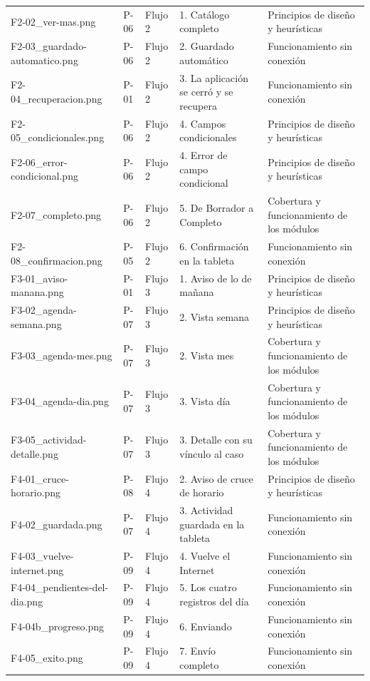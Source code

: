 \begin{longtable}{@{}p{4.2cm}p{1.1cm}p{2.2cm}p{3.2cm}p{3.4cm}@{}}
F2-02\_ver-mas.png & P-06 & Flujo 2 & 1. Catálogo completo & Principios de diseño y heurísticas \\
F2-03\_guardado-automatico.png & P-06 & Flujo 2 & 2. Guardado automático & Funcionamiento sin conexión \\
F2-04\_recuperacion.png & P-01 & Flujo 2 & 3. La aplicación se cerró y se recupera & Funcionamiento sin conexión \\
F2-05\_condicionales.png & P-06 & Flujo 2 & 4. Campos condicionales & Principios de diseño y heurísticas \\
F2-06\_error-condicional.png & P-06 & Flujo 2 & 4. Error de campo condicional & Principios de diseño y heurísticas \\
F2-07\_completo.png & P-06 & Flujo 2 & 5. De Borrador a Completo & Cobertura y funcionamiento de los módulos \\
F2-08\_confirmacion.png & P-05 & Flujo 2 & 6. Confirmación en la tableta & Funcionamiento sin conexión \\
F3-01\_aviso-manana.png & P-01 & Flujo 3 & 1. Aviso de lo de mañana & Principios de diseño y heurísticas \\
F3-02\_agenda-semana.png & P-07 & Flujo 3 & 2. Vista semana & Principios de diseño y heurísticas \\
F3-03\_agenda-mes.png & P-07 & Flujo 3 & 2. Vista mes & Cobertura y funcionamiento de los módulos \\
F3-04\_agenda-dia.png & P-07 & Flujo 3 & 3. Vista día & Cobertura y funcionamiento de los módulos \\
F3-05\_actividad-detalle.png & P-07 & Flujo 3 & 3. Detalle con su vínculo al caso & Cobertura y funcionamiento de los módulos \\
F4-01\_cruce-horario.png & P-08 & Flujo 4 & 2. Aviso de cruce de horario & Principios de diseño y heurísticas \\
F4-02\_guardada.png & P-07 & Flujo 4 & 3. Actividad guardada en la tableta & Funcionamiento sin conexión \\
F4-03\_vuelve-internet.png & P-09 & Flujo 4 & 4. Vuelve el Internet & Funcionamiento sin conexión \\
F4-04\_pendientes-del-dia.png & P-09 & Flujo 4 & 5. Los cuatro registros del día & Funcionamiento sin conexión \\
F4-04b\_progreso.png & P-09 & Flujo 4 & 6. Enviando & Funcionamiento sin conexión \\
F4-05\_exito.png & P-09 & Flujo 4 & 7. Envío completo & Funcionamiento sin conexión \\

\end{longtable}
